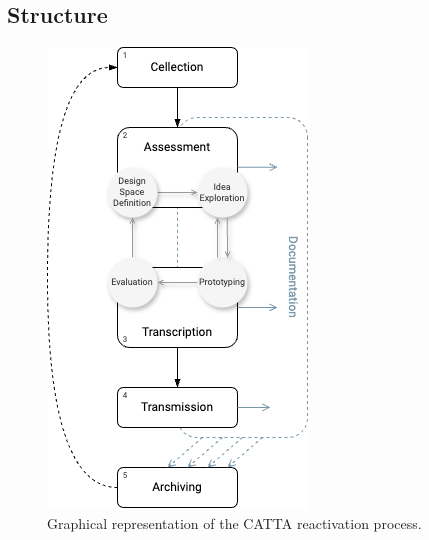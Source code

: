 \subsection{Structure}
\begin{figure}[!h]
    \centering
    \includegraphics[width=0.7\linewidth]{chapters/3-mdc_model-reactivation_workflow-instruction_template/image/graph03-catta.png}
    \caption{Graphical representation of the CATTA reactivation process.}
    \label{fig:c3-catta}
\end{figure} 

